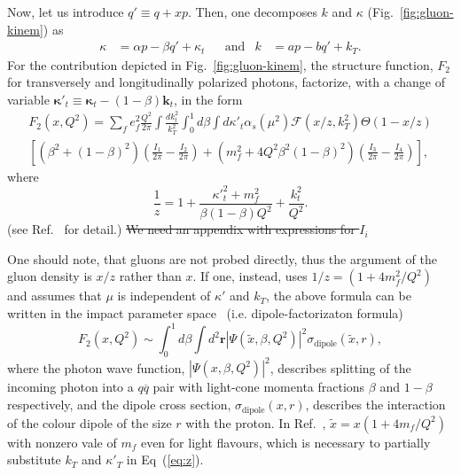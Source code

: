 \documentclass[11pt]{article}
\numberwithin{equation}{section}
\numberwithin{table}{section}
\numberwithin{figure}{section}
\begin{document}
Now, let us introduce $q'\equiv q+x p$. 
Then, one  decomposes $k$ and $\kappa$ (Fig.~\ref{fig:gluon-kinem}) as
\begin{align}
    \kappa&=\alpha p-\beta q'+\kappa_t&&\mathrm{and}& k&=a p- bq'+k_T.
\end{align}
For the contribution depicted in Fig.~\ref{fig:gluon-kinem}, the structure function, $F_2$ for transversely and longitudinally polarized photons, factorize, with a change of variable  ${\boldsymbol{\kappa}'}_t\equiv{\boldsymbol{\kappa}_t}-(1-\beta)\mathbf{k}_t$, in the form~\cite{ Kimber:2001uaa,Kwiecinski:1997ee}
\begin{multline}
	F_2(x,Q^2)=\sum_f e_f^2 \frac{Q^2}{2\pi}\int\frac{dk^2_t}{k_T^2}\int^1_0d\beta\int d{\kappa'}_t\alpha_s(\mu^2) \mathcal{F}(x/z,k_T^2)\Theta(1-x/z)\\
	\left[\left(\beta^2+(1-\beta)^2\right)\left(\frac{I_1}{2\pi}-\frac{I_2}{2\pi}\right)
	+\left(m_f^2+4Q^2\beta^2(1-\beta)^2\right)\left(\frac{I_3}{2\pi}-\frac{I_4}{2\pi}\right)\right],
	\label{eq:angle-integrated}
\end{multline}
where
\begin{equation}
	\frac{1}{z}=1+\frac{{\kappa'}^2_t+m_f^2}{\beta(1-\beta)Q^2}+\frac{k^2_t}{Q^2}.
	\label{eq:z}
\end{equation}
(see Ref.~\cite{ Kimber:2001uaa,Kwiecinski:1997ee} for detail.)
\sout{{\color{red} We need an appendix with expressions for $I_i$}}

One should note, that gluons are not probed directly, thus the argument of the gluon density is $x/z$ rather than $x$.
If one, instead, uses $ 1/z=\left(1+4 m_f^2/Q^2\right)$ and assumes that $\mu$ is independent of $\kappa'$ and $k_T$, 
the above formula can be written in the impact parameter space~\cite{Golec-Biernat:1998zce,Nikolaev:1990ja} (i.e. dipole-factorizaton formula)
\begin{equation}
F_2\left(x,Q^2\right)\sim\int^1_0d\beta \int d^2\mathbf{r}\left|\Psi\left(\tilde{x},\beta,Q^2\right)\right|^2\sigma_{\mathrm{dipole}}\left(\tilde{x},r\right),
\label{eq:dipole-factorization}
\end{equation}
where the photon wave function, $\left|\Psi\left(x,\beta,Q^2\right)\right|^2$, describes splitting of the incoming photon into a $q\overline{q}$ pair with light-cone momenta fractions $\beta$ and $1-\beta$ respectively, and the dipole cross section, $\sigma_{\mathrm{dipole}}\left(x,r\right)$, describes the interaction of the colour dipole of the size $r$ with the proton. In Ref.~\cite{Golec-Biernat:1998zce}, $\tilde{x}=x(1+4m_f/Q^2)$ with nonzero vale of $m_f$ even for light flavours, which is necessary to partially substitute $k_T$ and ${\kappa'}_T$ in Eq~(\ref{eq:z}). \\
\end{document}
